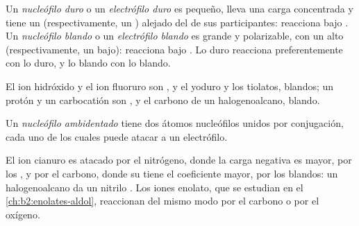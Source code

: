 \begin{definition}\label{def:b2:frontier-orbitals:hard-soft}
Un \emph{nucleófilo duro} o un \emph{electrófilo duro}
 es pequeño, lleva una carga concentrada y tiene
un  (respectivamente, un ) alejado del de sus participantes: reacciona bajo . Un \emph{nucleófilo blando} o un \emph{electrófilo blando}
 es grande y polarizable, con un  alto
(respectivamente, un  bajo): reacciona bajo . Lo duro reacciona preferentemente
con lo duro, y lo blando con lo blando.
\end{definition}

El ion hidróxido y el ion fluoruro son , y el yoduro y los tiolatos,
blandos; un protón y un carbocatión son , y el carbono de un
halogenoalcano, blando.

\begin{definition}\label{def:b2:frontier-orbitals:ambident}
Un \emph{nucleófilo ambidentado} tiene dos átomos nucleófilos
unidos por conjugación, cada uno de los cuales puede atacar a un electrófilo.
\end{definition}

El ion cianuro es atacado por el nitrógeno, donde la carga negativa es mayor, por los , y por el carbono, donde su  tiene el coeficiente mayor, por los blandos:
un halogenoalcano da un nitrilo . Los iones enolato, que se estudian en el
\cref{ch:b2:enolates-aldol}, reaccionan del mismo modo por el carbono o por el oxígeno.

